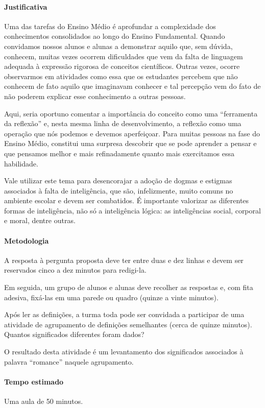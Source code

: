 \documentclass[12pt]{extarticle}
\begin{document}
{\paragraph{Justificativa}
Uma das tarefas do Ensino Médio é aprofundar a complexidade dos
conhecimentos consolidados ao longo do Ensino Fundamental. Quando
convidamos nossos alunos e alunas a demonstrar aquilo que, sem dúvida,
conhecem, muitas vezes ocorrem dificuldades que vem da falta de
linguagem adequada à expressão rigorosa de conceitos científicos. Outras
vezes, ocorre observarmos em atividades como essa que os estudantes
percebem que não conhecem de fato aquilo que imaginavam conhecer e tal
percepção vem do fato de não poderem explicar esse conhecimento a outras
pessoas.

Aqui, seria oportuno comentar a importância do conceito como uma
``ferramenta da reflexão'' e, nesta mesma linha de desenvolvimento, a
reflexão como uma operação que nós podemos e devemos aperfeiçoar. Para
muitas pessoas na fase do Ensino Médio, constitui uma surpresa descobrir
que se pode aprender a pensar e que pensamos melhor e mais refinadamente
quanto mais exercitamos essa habilidade.

Vale utilizar este tema para desencorajar a adoção de dogmas e estigmas
associados à falta de inteligência, que são, infelizmente, muito comuns
no ambiente escolar e devem ser combatidos. É importante valorizar as
diferentes formas de inteligência, não só a inteligência lógica: as
inteligências social, corporal e moral, dentre outras.


\paragraph{Metodologia}
A resposta à pergunta proposta deve ter entre duas e dez linhas e devem ser reservados cinco a dez minutos para redigi-la.

Em seguida, um grupo de alunos e alunas deve recolher as respostas e,
com fita adesiva, fixá-las em uma parede ou quadro (quinze a vinte
minutos).

Após ler as definições, a turma toda pode ser convidada a participar de
uma atividade de agrupamento de definições semelhantes (cerca de quinze
minutos). Quantos significados diferentes foram dados?

O resultado desta atividade é um levantamento dos significados
associados à palavra ``romance'' naquele agrupamento.

\paragraph{Tempo estimado} Uma aula de 50 minutos.

}
\end{document}
